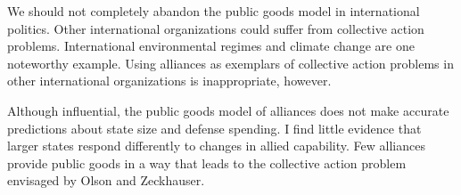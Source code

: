\documentclass[12pt]{article}
\begin{document}
We should not completely abandon the public goods model in international politics. 
Other international organizations could suffer from collective action problems.
International environmental regimes and climate change are one noteworthy example.  
Using alliances as exemplars of collective action problems in other international organizations is inappropriate, however. 


Although influential, the public goods model of alliances does not make accurate predictions about state size and defense spending. 
I find little evidence that larger states respond differently to changes in allied capability. 
Few alliances provide public goods in a way that leads to the collective action problem envisaged by Olson and Zeckhauser. 



\singlespace


 
\end{document}
